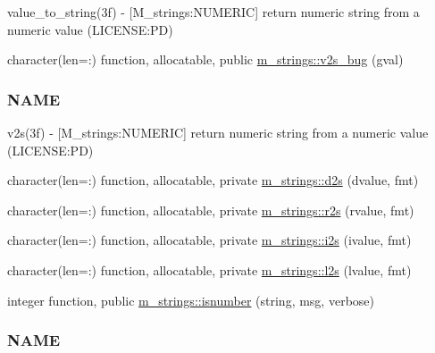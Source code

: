 \begin{DoxyCompactItemize}
\begin{DoxyCompactList}
value\+\_\+to\+\_\+string(3f) -\/ \mbox{[}M\+\_\+strings\+:N\+U\+M\+E\+R\+IC\mbox{]} return numeric string from a numeric value (L\+I\+C\+E\+N\+SE\+:PD) \end{DoxyCompactList}\item 
character(len=\+:) function, allocatable, public \mbox{\hyperlink{namespacem__strings_a76a00e3ca7fb7c9b9cadcd484c6e3946}{m\+\_\+strings\+::v2s\+\_\+bug}} (gval)
\begin{DoxyCompactList}\small\item\em \subsubsection*{N\+A\+ME}

v2s(3f) -\/ \mbox{[}M\+\_\+strings\+:N\+U\+M\+E\+R\+IC\mbox{]} return numeric string from a numeric value (L\+I\+C\+E\+N\+SE\+:PD) \end{DoxyCompactList}\item 
character(len=\+:) function, allocatable, private \mbox{\hyperlink{namespacem__strings_a14715e071aea9030b4c68c22fa5a455d}{m\+\_\+strings\+::d2s}} (dvalue, fmt)
\item 
character(len=\+:) function, allocatable, private \mbox{\hyperlink{namespacem__strings_ab67ea90007b3f2eb308a5fe8d1cf0df1}{m\+\_\+strings\+::r2s}} (rvalue, fmt)
\item 
character(len=\+:) function, allocatable, private \mbox{\hyperlink{namespacem__strings_a76d3a650fbfec1f65d8fd81042347408}{m\+\_\+strings\+::i2s}} (ivalue, fmt)
\item 
character(len=\+:) function, allocatable, private \mbox{\hyperlink{namespacem__strings_a75aa4dfd0a231e2bcad03d26231a7c29}{m\+\_\+strings\+::l2s}} (lvalue, fmt)
\item 
integer function, public \mbox{\hyperlink{namespacem__strings_a2b6c57cbc52fc86d2f02d0936d3484af}{m\+\_\+strings\+::isnumber}} (string, msg, verbose)
\begin{DoxyCompactList}\small\item\em \subsubsection*{N\+A\+ME}


\end{DoxyCompactList}
\end{DoxyCompactItemize}
